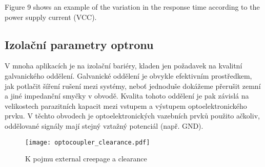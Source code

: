           Figure 9 shows an example of the variation in the response time according to the power
          supply current (VCC).
          
      \subsection{Izolační parametry optronu}
        V mnoha aplikacích je na izolační bariéry, kladen jen požadavek na kvalitní galvanického
        oddělení. Galvanické oddělení je obvykle efektivním prostředkem, jak potlačit šíření rušení
        mezi systémy, neboť jednoduše dokážeme přerušit zemní a jiné impedanční smyčky v obvodě.
        Kvalita tohoto oddělení je pak závislá na velikostech parazitních kapacit mezi vstupem a
        výstupem optoelektronického prvku. V těchto obvodech je optoelektronických vazebních prvků
        použito ačkoliv, oddělované signály mají stejný vztažný potenciál (např. GND). 
        
        \begin{figure}[hb!]
          \centering
          \texttt{[image: optocoupler\_clearance.pdf]}
          \caption{K pojmu external creepage a clearance}
          \label{es:fig_optocoupler_clearance}
        \end{figure}

\ChapterBiblioList